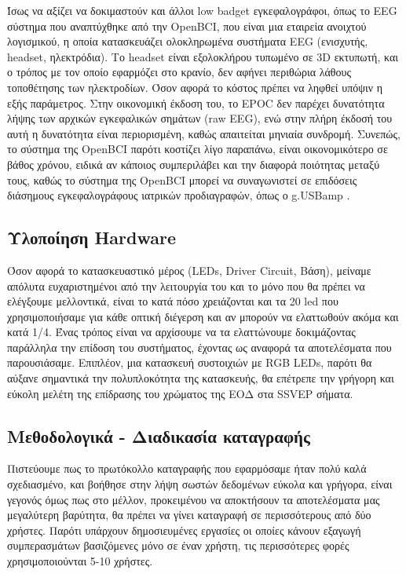 \documentclass[11pt,a4paper,english,greek,twoside]{../Thesis}
\begin{document}
\par Ίσως να αξίζει να δοκιμαστούν και άλλοι low badget εγκεφαλογράφοι, όπως το EEG σύστημα που αναπτύχθηκε από την OpenBCI, που είναι μια εταιρεία ανοιχτού λογισμικού, η οποία κατασκευάζει ολοκληρωμένα συστήματα EEG (ενισχυτής, headset, ηλεκτρόδια). Το headset είναι εξολοκλήρου τυπωμένο σε 3D εκτυπωτή, και ο τρόπος με τον οποίο εφαρμόζει στο κρανίο, δεν αφήνει περιθώρια λάθους τοποθέτησης των ηλεκτροδίων. Όσον αφορά το κόστος πρέπει να ληφθεί υπόψιν η εξής παράμετρος. Στην οικονομική έκδοση του, το EPOC δεν παρέχει δυνατότητα λήψης των αρχικών εγκεφαλικών σημάτων (raw EEG), ενώ στην πλήρη έκδοσή του αυτή η δυνατότητα είναι περιορισμένη, καθώς απαιτείται μηνιαία συνδρομή. Συνεπώς, το σύστημα της OpenBCI παρότι κοστίζει λίγο παραπάνω, είναι οικονομικότερο σε βάθος χρόνου, ειδικά αν κάποιος συμπεριλάβει και την διαφορά ποιότητας μεταξύ τους, καθώς το σύστημα της OpenBCI μπορεί να συναγωνιστεί σε επιδόσεις διάσημους εγκεφαλογράφους ιατρικών προδιαγραφών, όπως ο g.USBamp \cite{Frey2016-fx}.

\subsection{Υλοποίηση Hardware}
Όσον αφορά το κατασκευαστικό μέρος (LEDs, Driver Circuit, Βάση), μείναμε απόλυτα ευχαριστημένοι από την λειτουργία του και το μόνο που θα πρέπει να ελέγξουμε μελλοντικά, είναι το κατά πόσο χρειάζονται και τα 20 led που χρησιμοποιήσαμε για κάθε οπτική διέγερση και αν μπορούν να ελαττωθούν ακόμα και κατά 1/4. Ένας τρόπος είναι να αρχίσουμε να τα ελαττώνουμε δοκιμάζοντας παράλληλα την επίδοση του συστήματος, έχοντας ως αναφορά τα αποτελέσματα που παρουσιάσαμε. Επιπλέον, μια κατασκευή συστοιχιών με RGB LEDs, παρότι θα αύξανε σημαντικά την πολυπλοκότητα της κατασκευής, θα επέτρεπε την γρήγορη και εύκολη μελέτη της επίδρασης του χρώματος της ΕΟΔ στα SSVEP σήματα. 

\subsection{Μεθοδολογικά - Διαδικασία καταγραφής}
Πιστεύουμε πως το πρωτόκολλο καταγραφής που εφαρμόσαμε ήταν πολύ καλά σχεδιασμένο, και βοήθησε στην λήψη σωστών δεδομένων εύκολα και γρήγορα, είναι γεγονός όμως πως στο μέλλον, προκειμένου να αποκτήσουν τα αποτελέσματα μας μεγαλύτερη βαρύτητα, θα πρέπει να γίνει καταγραφή σε περισσότερους από δύο χρήστες. Παρότι υπάρχουν δημοσιευμένες εργασίες οι οποίες κάνουν εξαγωγή συμπερασμάτων βασιζόμενες μόνο σε έναν χρήστη, τις περισσότερες φορές χρησιμοποιούνται 5-10 χρήστες.
\end{document}
